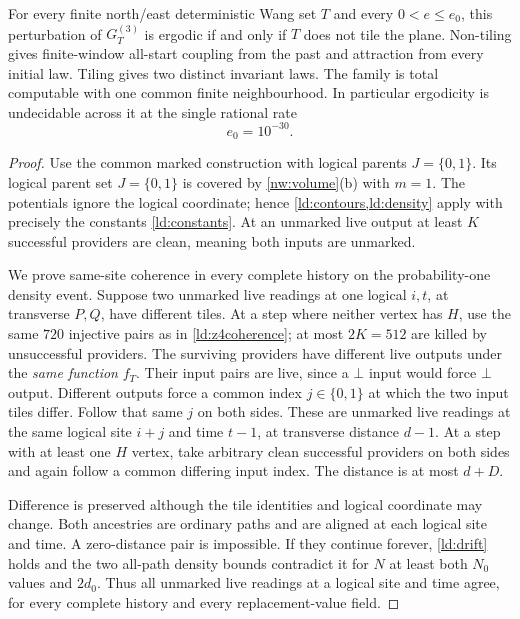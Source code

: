 \begin{theorem}\label{ld:z3}
For every finite north/east deterministic Wang set $T$ and every $0<e\le e_0$, this perturbation of $G_T^{(3)}$ is ergodic if and only if $T$ does not tile the plane. Non-tiling gives finite-window all-start coupling from the past and attraction from every initial law. Tiling gives two distinct invariant laws. The family is total computable with one common finite neighbourhood. In particular ergodicity is undecidable across it at the single rational rate
\[
 e_0=10^{-30}.
\]
\end{theorem}
\begin{proof}
Use the common marked construction with logical parents $J=\{0,1\}$. Its logical parent set $J=\{0,1\}$ is covered by \cref{nw:volume}(b) with $m=1$. The potentials ignore the logical coordinate; hence \cref{ld:contours,ld:density} apply with precisely the constants \eqref{ld:constants}. At an unmarked live output at least $K$ successful providers are clean, meaning both inputs are unmarked.

We prove same-site coherence in every complete history on the probability-one density event. Suppose two unmarked live readings at one logical $i,t$, at transverse $P,Q$, have different tiles. At a step where neither vertex has $H$, use the same $720$ injective pairs as in \cref{ld:z4coherence}; at most $2K=512$ are killed by unsuccessful providers. The surviving providers have different live outputs under the \emph{same function} $f_T$. Their input pairs are live, since a $\bot$ input would force $\bot$ output. Different outputs force a common index $j\in\{0,1\}$ at which the two input tiles differ. Follow that same $j$ on both sides. These are unmarked live readings at the same logical site $i+j$ and time $t-1$, at transverse distance $d-1$. At a step with at least one $H$ vertex, take arbitrary clean successful providers on both sides and again follow a common differing input index. The distance is at most $d+D$.

Difference is preserved although the tile identities and logical coordinate may change. Both ancestries are ordinary paths and are aligned at each logical site and time. A zero-distance pair is impossible. If they continue forever, \eqref{ld:drift} holds and the two all-path density bounds contradict it for $N$ at least both $N_0$ values and $2d_0$. Thus all unmarked live readings at a logical site and time agree, for every complete history and every replacement-value field.


\end{proof}
